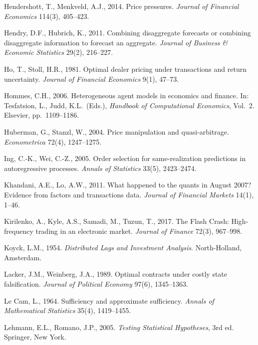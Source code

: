 \documentclass[11pt,letterpaper]{article}
\theoremstyle{definition}
\begin{document}
\begin{list}{}{\footnotesize\linespread{0.89}\selectfont\setlength{\leftmargin}{1.3em}\setlength{\itemindent}{-1.8em}\setlength{\itemsep}{0pt}\setlength{\parsep}{0pt}}
\item Hendershott, T., Menkveld, A.J., 2014. Price pressures. \emph{Journal of Financial Economics} 114(3), 405--423.

\item Hendry, D.F., Hubrich, K., 2011. Combining disaggregate forecasts or combining disaggregate information to forecast an aggregate. \emph{Journal of Business \& Economic Statistics} 29(2), 216--227.

\item Ho, T., Stoll, H.R., 1981. Optimal dealer pricing under transactions and return uncertainty. \emph{Journal of Financial Economics} 9(1), 47--73.

\item Hommes, C.H., 2006. Heterogeneous agent models in economics and finance. In: Tesfatsion, L., Judd, K.L.\ (Eds.), \emph{Handbook of Computational Economics}, Vol.~2. Elsevier, pp.\ 1109--1186.

\item Huberman, G., Stanzl, W., 2004. Price manipulation and quasi-arbitrage. \emph{Econometrica} 72(4), 1247--1275.

\item Ing, C.-K., Wei, C.-Z., 2005. Order selection for same-realization predictions in autoregressive processes. \emph{Annals of Statistics} 33(5), 2423--2474.

\item Khandani, A.E., Lo, A.W., 2011. What happened to the quants in August 2007? Evidence from factors and transactions data. \emph{Journal of Financial Markets} 14(1), 1--46.

\item Kirilenko, A., Kyle, A.S., Samadi, M., Tuzun, T., 2017. The Flash Crash: High-frequency trading in an electronic market. \emph{Journal of Finance} 72(3), 967--998.

\item Koyck, L.M., 1954. \emph{Distributed Lags and Investment Analysis}. North-Holland, Amsterdam.

\item Lacker, J.M., Weinberg, J.A., 1989. Optimal contracts under costly state falsification. \emph{Journal of Political Economy} 97(6), 1345--1363.

\item Le Cam, L., 1964. Sufficiency and approximate sufficiency. \emph{Annals of Mathematical Statistics} 35(4), 1419--1455.

\item Lehmann, E.L., Romano, J.P., 2005. \emph{Testing Statistical Hypotheses}, 3rd ed. Springer, New York.


\end{list}
\end{document}
